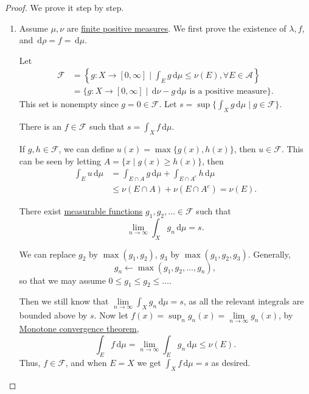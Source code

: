 \begin{proof}
	We prove it step by step.
	\begin{enumerate}
		\item Assume \(\mu, \nu\) are \hyperref[def:finite-signed-measure]{finite positive measures}. We first prove the existence of \(\lambda , f\),
		      and \(\,\mathrm{d} \rho = f = \,\mathrm{d} \mu \).

		      Let
		      \[
			      \begin{split}
				      \mathscr{F} & = \left\{g \colon X \to [0,\infty] \mid \int_E g \,\mathrm{d} \mu \leq \nu(E), \forall E \in \mathcal{A}\right\} \\
				      & = \{g \colon X \to [0,\infty] \mid \,\mathrm{d} \nu - g\,\mathrm{d} \mu \text{ is a positive measure}\}.
			      \end{split}
		      \]
		      This set is nonempty since \(g = 0 \in \mathscr{F}\). Let \(s = \sup\{\int_X g \,\mathrm{d} \mu \mid g \in \mathscr{F}\}\).

		      \begin{claim}
			      There is an \(f \in \mathscr{F}\) such that \(s = \int_X f \,\mathrm{d} \mu\).
		      \end{claim}
		      \begin{explanation}
			      If \(g, h \in \mathscr{F}\), we can define \(u(x) = \max\{g(x),h(x)\}\), then \(u \in \mathscr{F}\). This can be seen by letting
			      \(A = \{x \mid g(x) \geq h(x)\}\), then
			      \[
				      \begin{split}
					      \int_E u \,\mathrm{d} \mu & = \int_{E \cap A} g \,\mathrm{d} \mu + \int_{E \cap A^c} h \,\mathrm{d} \mu \\
					      & \leq \nu(E \cap A) + \nu(E \cap A^c) = \nu(E).
				      \end{split}
			      \]

			      There exist \hyperref[def:measurable-function]{measurable functions} \(g_1,g_2,\ldots \in \mathscr{F}\) such that
			      \[
				      \lim_{n \to \infty} \int_X g_n \,\mathrm{d} \mu = s.
			      \]

			      We can replace \(g_2\) by \(\max(g_1,g_2)\), \(g_3\) by \(\max(g_1,g_2,g_3)\). Generally,
			      \[
				      g_{n} \gets \mathop{\max} (g_1, g_2, \ldots , g_n),
			      \]
			      so that we may assume \(0 \leq g_1 \leq g_2 \leq \ldots\).

			      Then we still know that \(\lim\limits_{n \to \infty} \int_X g_n \,\mathrm{d} \mu = s\), as all the relevant integrals are bounded above by \(s\).
			      Now let \(f(x) = \sup_n g_n(x) = \lim\limits_{n \to \infty} g_n(x)\), by \hyperref[thm:MCT]{Monotone convergence theorem},
			      \[
				      \int_E f \,\mathrm{d} \mu = \lim_{n \to \infty} \int_E g_n \,\mathrm{d} \mu \leq \nu(E).
			      \]
			      Thus, \(f \in \mathscr{F}\), and when \(E = X\) we get \(\int_X f \,\mathrm{d} \mu = s\) as desired.
		      \end{explanation}


\end{enumerate}
\end{proof}
